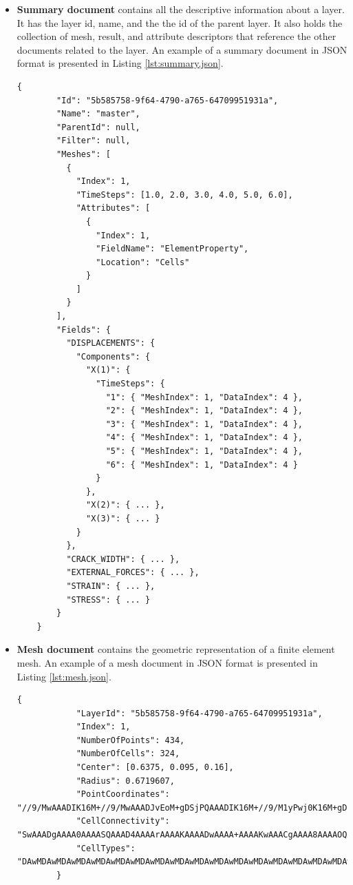 \begin{itemize}

    \item \textbf{Summary document} contains all the descriptive information about a layer. It has the layer id, name, and the the id of the parent layer. It also holds the collection of mesh, result, and attribute descriptors that reference the other documents related to the layer. An example of a summary document in JSON format is presented in Listing \ref{lst:summary.json}.

    \pagebreak

    \begin{lstlisting}[style=json,caption=Example of summary.json document.,label=lst:summary.json]
    {
        "Id": "5b585758-9f64-4790-a765-64709951931a",
        "Name": "master",
        "ParentId": null,
        "Filter": null,
        "Meshes": [
          {
            "Index": 1,
            "TimeSteps": [1.0, 2.0, 3.0, 4.0, 5.0, 6.0],
            "Attributes": [
              {
                "Index": 1,
                "FieldName": "ElementProperty",
                "Location": "Cells"
              }
            ]
          }
        ],
        "Fields": {
          "DISPLACEMENTS": {
            "Components": {
              "X(1)": {
                "TimeSteps": {
                  "1": { "MeshIndex": 1, "DataIndex": 4 },
                  "2": { "MeshIndex": 1, "DataIndex": 4 },
                  "3": { "MeshIndex": 1, "DataIndex": 4 },
                  "4": { "MeshIndex": 1, "DataIndex": 4 },
                  "5": { "MeshIndex": 1, "DataIndex": 4 },
                  "6": { "MeshIndex": 1, "DataIndex": 4 }
                }
              },
              "X(2)": { ... },
              "X(3)": { ... }
            }
          },
          "CRACK_WIDTH": { ... },
          "EXTERNAL_FORCES": { ... },
          "STRAIN": { ... },
          "STRESS": { ... }
        }
    }
    \end{lstlisting}
    
    \vspace{5mm}

    \item \textbf{Mesh document} contains the geometric representation of a finite element mesh. An example of a mesh document in JSON format is presented in Listing \ref{lst:mesh.json}.
    
    \begin{lstlisting}[style=json,caption=Example of mesh.json document.,label=lst:mesh.json]
        {
            "LayerId": "5b585758-9f64-4790-a765-64709951931a",
            "Index": 1,
            "NumberOfPoints": 434,
            "NumberOfCells": 324,
            "Center": [0.6375, 0.095, 0.16],
            "Radius": 0.6719607,
            "PointCoordinates": "//9/MwAAADIK16M+//9/MwAAADJvEoM+gDSjPQAAADIK16M+//9/M1yPwj0K16M+gDSjPQAAAD...",
            "CellConnectivity": "SwAAADgAAAA0AAAASQAAAD4AAAArAAAAKAAAADwAAAA+AAAAKwAAACgAAAA8AAAAOQAAACUAAA...",
            "CellTypes": "DAwMDAwMDAwMDAwMDAwMDAwMDAwMDAwMDAwMDAwMDAwMDAwMDAwMDAwMDAwMDAwMDAwMDAwMDAwMDAwMD..."
        }
    \end{lstlisting}


\end{itemize}

